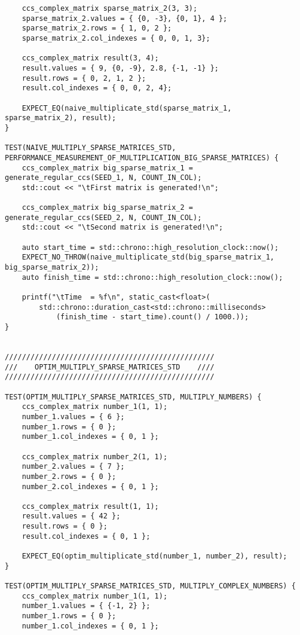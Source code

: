 \documentclass{report}
\begin{document}
\begin{itemize}
\begin{itemize}
\begin{lstlisting}
    ccs_complex_matrix sparse_matrix_2(3, 3);
    sparse_matrix_2.values = { {0, -3}, {0, 1}, 4 };
    sparse_matrix_2.rows = { 1, 0, 2 };
    sparse_matrix_2.col_indexes = { 0, 0, 1, 3};

    ccs_complex_matrix result(3, 4);
    result.values = { 9, {0, -9}, 2.8, {-1, -1} };
    result.rows = { 0, 2, 1, 2 };
    result.col_indexes = { 0, 0, 2, 4};

    EXPECT_EQ(naive_multiplicate_std(sparse_matrix_1, sparse_matrix_2), result);
}

TEST(NAIVE_MULTIPLY_SPARSE_MATRICES_STD, PERFORMANCE_MEASUREMENT_OF_MULTIPLICATION_BIG_SPARSE_MATRICES) {
    ccs_complex_matrix big_sparse_matrix_1 = generate_regular_ccs(SEED_1, N, COUNT_IN_COL);
    std::cout << "\tFirst matrix is generated!\n";

    ccs_complex_matrix big_sparse_matrix_2 = generate_regular_ccs(SEED_2, N, COUNT_IN_COL);
    std::cout << "\tSecond matrix is generated!\n";

    auto start_time = std::chrono::high_resolution_clock::now();
    EXPECT_NO_THROW(naive_multiplicate_std(big_sparse_matrix_1, big_sparse_matrix_2));
    auto finish_time = std::chrono::high_resolution_clock::now();

    printf("\tTime  = %f\n", static_cast<float>(
        std::chrono::duration_cast<std::chrono::milliseconds>
            (finish_time - start_time).count() / 1000.));
}


/////////////////////////////////////////////////
///    OPTIM_MULTIPLY_SPARSE_MATRICES_STD    ////
/////////////////////////////////////////////////

TEST(OPTIM_MULTIPLY_SPARSE_MATRICES_STD, MULTIPLY_NUMBERS) {
    ccs_complex_matrix number_1(1, 1);
    number_1.values = { 6 };
    number_1.rows = { 0 };
    number_1.col_indexes = { 0, 1 };

    ccs_complex_matrix number_2(1, 1);
    number_2.values = { 7 };
    number_2.rows = { 0 };
    number_2.col_indexes = { 0, 1 };

    ccs_complex_matrix result(1, 1);
    result.values = { 42 };
    result.rows = { 0 };
    result.col_indexes = { 0, 1 };

    EXPECT_EQ(optim_multiplicate_std(number_1, number_2), result);
}

TEST(OPTIM_MULTIPLY_SPARSE_MATRICES_STD, MULTIPLY_COMPLEX_NUMBERS) {
    ccs_complex_matrix number_1(1, 1);
    number_1.values = { {-1, 2} };
    number_1.rows = { 0 };
    number_1.col_indexes = { 0, 1 };


\end{lstlisting}
\end{itemize}
\end{itemize}
\end{document}
